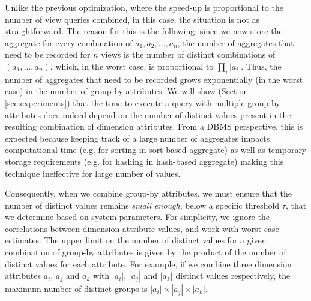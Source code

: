 Unlike the previous optimization, where the speed-up is proportional to the
number of view queries combined, in this case, the situation is not as straightforward. 
The reason for this is the following:
since we now store the aggregate for every combination
of $a_1, a_2, \ldots, a_n$, 
the number of aggregates that need to be recorded for 
$n$ views is the number of distinct combinations
of $(a_1, \ldots, a_n)$, which, in the worst case, 
is proportional to $\prod_i |a_i|$.
Thus, the number of aggregates that need to be recorded 
grows exponentially (in the worst case) in the
number of group-by attributes. 
We will show (Section \ref{sec:experiments}) that 
the time to execute a query with multiple group-by attributes does indeed
depend on the number of distinct values present in the resulting 
combination of dimension attributes. 
From a DBMS perspective, this is expected because keeping track of a large
number of aggregates impacts computational time (e.g. for sorting in sort-based aggregate)
as well as temporary storage requirements (e.g. for hashing in hash-based
aggregate) making this technique ineffective for large number of values.

Consequently, when we combine group-by attributes, we must ensure that the
number of distinct values remains {\it small enough}, below a specific 
threshold $\tau$, that we determine based on system parameters.
For simplicity, we ignore the correlations between dimension attribute values,
and work with worst-case estimates. 
The upper limit on the number of distinct values for a given combination of
group-by attributes is given by the product of the number of distinct values
for each attribute.
For example, if we combine three dimension attributes $a_i$, $a_j$ and $a_k$
with $|a_i|$, $|a_j|$ and $|a_k|$ distinct values respectively, the maximum number of
distinct groups is $|a_i|\times |a_j| \times |a_k|$.
  
